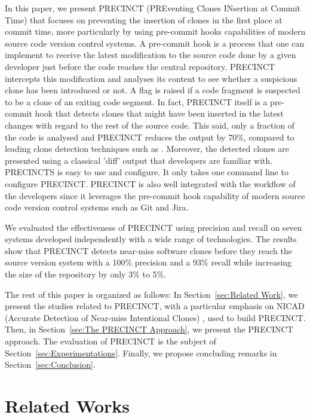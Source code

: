 \documentclass[conference]{IEEEtran}
\begin{document}
In this paper, we present PRECINCT (PREventing Clones INsertion at Commit Time) that focuses on preventing the insertion of clones in the first place at commit time, more particularly by  using pre-commit hooks capabilities of modern source code version control systems. A pre-commit hook is a process that one can implement to receive the latest modification to the source code done by a given developer just before the code reaches the central repository.  PRECINCT intercepts this modification and analyses its  content to see whether a suspicious clone has been introduced or not. A flag is raised if a code fragment is suspected to be a clone of an exiting code segment. In fact, PRECINCT itself is a pre-commit hook that detects clones that might have been inserted in the latest changes with regard to the rest of the source code. This said, only a fraction of the code is analysed and PRECINCT reduces the output by 70\%, compared to leading clone detection techniques such as \cite{Cordy2011}. Moreover, the detected clones are presented using a classical 'diff' output that developers are familiar with.  PRECINCTS is easy to use and configure. It only takes  one command line to configure PRECINCT. PRECINCT is also well integrated with the workflow of the developers since it leverages the pre-commit hook capability of modern source code version control systems such as Git and Jira.

We evaluated the effectiveness of PRECINCT using precision and recall on seven systems developed independently with a wide range of technologies. The results show that PRECINCT detects near-miss software clones before they reach the source version system with a 100\% precision and a 93\% recall while increasing the size of the repository by only 3\% to 5\%.

The rest of this paper is organized as follows: In Section~\ref{sec:Related Work}, we present the studies related to PRECINCT, with a particular emphasis on NICAD (Accurate Detection of Near-miss Intentional Clones) \cite{Cordy2011}, used to build PRECINCT. Then, in Section~\ref{sec:The PRECINCT Approach}, we present the PRECINCT approach. The evaluation of PRECINCT is the subject of  Section~\ref{sec:Experimentations}.
Finally, we propose concluding remarks in Section~\ref{sec:Conclusion}.

\section{Related Works}
\label{sec:Related Works}
\end{document}
